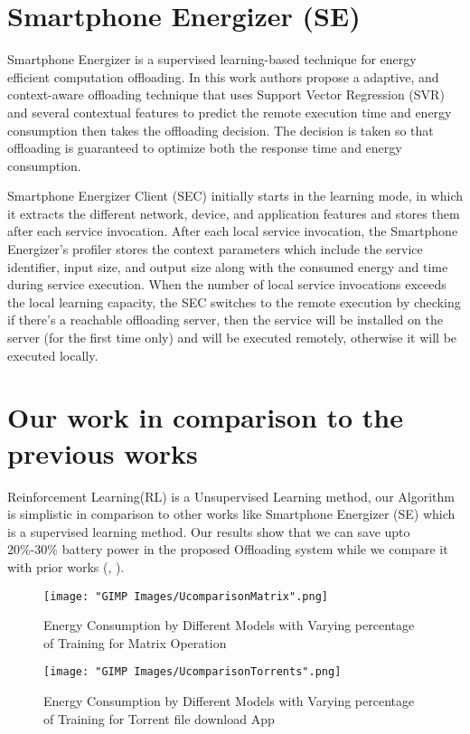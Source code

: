 \documentclass{report}
\begin{document}
\section{Smartphone Energizer (SE) }
Smartphone Energizer \cite{khairy2013smartphone} is a supervised learning-based technique for energy efficient computation offloading. In this work authors propose a adaptive, and context-aware offloading technique that uses Support Vector
Regression (SVR) and several contextual features to predict the remote execution time and energy consumption then takes the offloading decision. The decision is taken so that offloading is guaranteed to optimize both the response time and energy
consumption.

Smartphone Energizer Client (SEC) initially starts in the learning mode, in which it extracts the different network, device, and application features and stores them after each service invocation. After each local service invocation, the
Smartphone Energizer’s profiler stores the context parameters which include the service identifier, input size, and output size along with the consumed energy and time during service execution. When the number of local service invocations exceeds the local
learning capacity, the SEC switches to the remote execution by checking if there's a reachable offloading server, then the service will be installed on the server (for the first time only) and will be executed remotely, otherwise it will be executed locally.

\section{Our work in comparison to the previous works}
Reinforcement Learning(RL) is a Unsupervised Learning method, our Algorithm is simplistic in comparison to other works like Smartphone Energizer (SE) \cite{khairy2013smartphone} which is a supervised learning method. Our results show that we can save upto 20\%-30\% battery power in the proposed Offloading system while we compare it with prior works (\cite{khairy2013smartphone}, \cite{flores2013adaptive}). 
\begin{figure}[h]
  \centering
  \texttt{[image: "GIMP Images/UcomparisonMatrix".png]}
  \caption{Energy Consumption by Different Models with Varying percentage of Training for Matrix Operation}
  \label{fig:EnergyConsumptionDiffModelsMatrix}
\end{figure}

\begin{figure}[h]
  \centering
  \texttt{[image: "GIMP Images/UcomparisonTorrents".png]}
  \caption{Energy Consumption by Different Models with Varying percentage of Training for Torrent file download App}
  \label{fig:EnergyConsumptionDiffModelsTorrent}
\end{figure}



\end{document}
